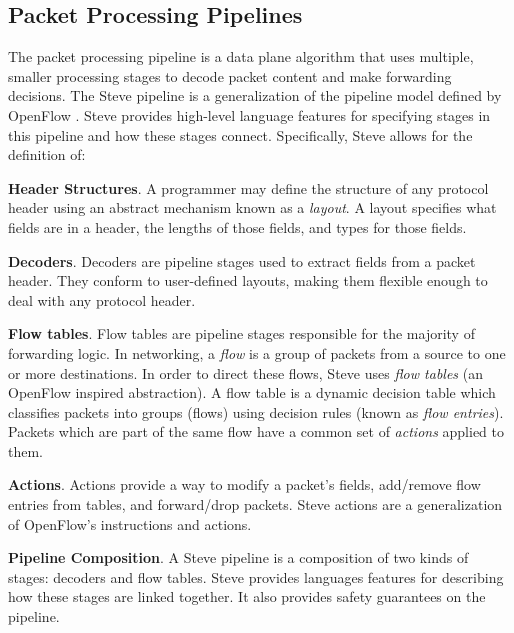 \subsection{Packet Processing Pipelines}

The packet processing pipeline is a data plane algorithm that
uses multiple, smaller processing stages to decode packet content and make
forwarding decisions.
The Steve pipeline is a generalization
of the pipeline model defined by OpenFlow \cite{openflow_spec}.
Steve provides high-level language features for specifying
stages in this pipeline and how these stages connect.
Specifically, Steve allows for the definition of:

\textbf{Header Structures}.
A programmer may define the structure of any protocol header using an abstract
mechanism known as a \emph{layout}.
A layout specifies what fields are in a header, the lengths of those fields,
and types for those fields.

\textbf{Decoders}. Decoders are pipeline stages used to extract
fields from a packet header.
They conform to user-defined layouts, making them flexible enough
to deal with any protocol header.

%

\textbf{Flow tables}.
Flow tables are pipeline stages responsible for the majority of forwarding logic.
In networking, a \emph{flow} is a group of packets from a source to one
or more  destinations. In order to direct these flows, Steve uses \emph{flow tables} (an OpenFlow inspired abstraction).
A flow table is a dynamic
decision table which classifies packets into groups (flows) using
decision rules (known as \emph{flow entries}).
Packets which are part of the same flow have a common set of \emph{actions}
applied to them.

\textbf{Actions}. Actions provide a way to modify a packet's fields, add/remove
flow entries from tables, and forward/drop packets. Steve actions are a
generalization
of OpenFlow's instructions and actions.

\textbf{Pipeline Composition}. A Steve pipeline is a composition of two kinds of
stages: decoders and flow tables.
Steve provides languages features for describing how these stages are linked
together. It also provides safety guarantees on the pipeline.

